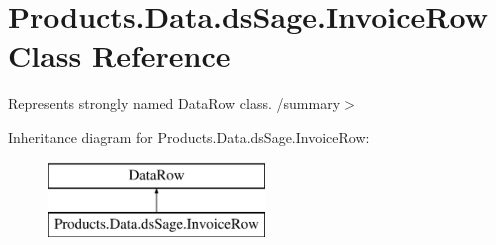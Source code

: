 \hypertarget{class_products_1_1_data_1_1ds_sage_1_1_invoice_row}{}\section{Products.\+Data.\+ds\+Sage.\+Invoice\+Row Class Reference}
\label{class_products_1_1_data_1_1ds_sage_1_1_invoice_row}


Represents strongly named Data\+Row class. /summary$>$  


Inheritance diagram for Products.\+Data.\+ds\+Sage.\+Invoice\+Row\+:\begin{figure}[H]
\begin{center}
\leavevmode
\includegraphics[height=2.000000cm]{class_products_1_1_data_1_1ds_sage_1_1_invoice_row}
\end{center}
\end{figure}
